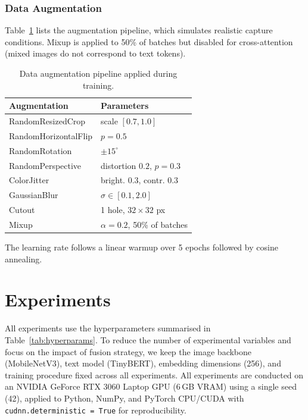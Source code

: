 \documentclass[10pt,twocolumn]{article}
\begin{document}
\subsubsection{Data Augmentation}

Table~\ref{tab:augmentation} lists the augmentation pipeline, which simulates realistic capture conditions. Mixup \citep{zhang2018mixup} is applied to 50\% of batches but disabled for cross-attention (mixed images do not correspond to text tokens).

\begin{table}[t]
\centering
\caption{Data augmentation pipeline applied during training.}
\label{tab:augmentation}
\small
\begin{tabular}{@{}ll@{}}
\toprule
\textbf{Augmentation} & \textbf{Parameters} \\
\midrule
RandomResizedCrop & scale $[0.7, 1.0]$ \\
RandomHorizontalFlip & $p = 0.5$ \\
RandomRotation & $\pm 15^{\circ}$ \\
RandomPerspective & distortion $0.2$, $p = 0.3$ \\
ColorJitter & bright. $0.3$, contr. $0.3$ \\
GaussianBlur & $\sigma \in [0.1, 2.0]$ \\
Cutout & 1 hole, $32 \!\times\! 32$ px \\
Mixup & $\alpha = 0.2$, 50\% of batches \\
\bottomrule
\end{tabular}
\end{table}

The learning rate follows a linear warmup over 5 epochs followed by cosine annealing.


\section{Experiments}
\label{sec:experiments}

All experiments use the hyperparameters summarised in Table~\ref{tab:hyperparams}. To reduce the number of experimental variables and focus on the impact of fusion strategy, we keep the image backbone (MobileNetV3), text model (TinyBERT), embedding dimensions (256), and training procedure fixed across all experiments. All experiments are conducted on an NVIDIA GeForce RTX 3060 Laptop GPU (6\,GB VRAM) using a single seed (42), applied to Python, NumPy, and PyTorch CPU/CUDA with \texttt{cudnn.deterministic = True} for reproducibility.
\end{document}
